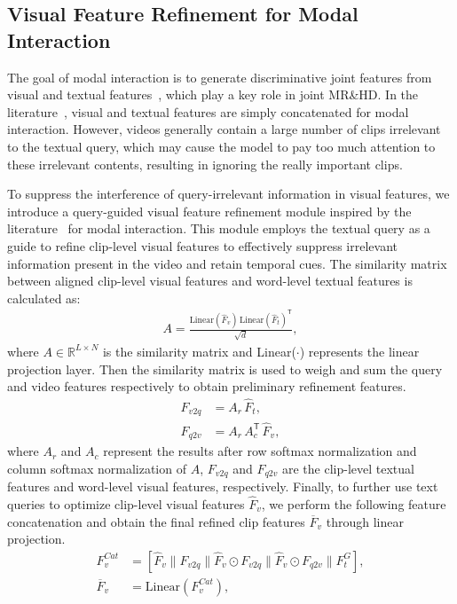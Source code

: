 \subsection{Visual Feature Refinement for Modal Interaction}
The goal of modal interaction is to generate discriminative joint features from visual and textual features~\cite{lei2021detecting}, which play a key role in joint MR\&HD.
In the literature~\cite{lei2021detecting}, visual and textual features are simply concatenated for modal interaction. However, videos generally contain a large number of clips irrelevant to the textual query, which may cause the model to pay too much attention to these irrelevant contents, resulting in ignoring the really important clips.

To suppress the interference of query-irrelevant information in visual features, we introduce a query-guided visual feature refinement module inspired by the literature~\cite{xiong2016dynamic} for modal interaction. This module employs the textual query as a guide to refine clip-level visual features to effectively suppress irrelevant information present in the video and retain temporal cues. The similarity matrix between aligned clip-level visual features and word-level textual features is calculated as:
\begin{align}
    A = \frac{\text{Linear}(\widehat{F}_{v}) \, \text{Linear}(\widehat{F}_{t})^{\mathsf{T}}}{\sqrt{d}},
\end{align}
where $A \in \mathbb{R}^{L \times N}$ is the similarity matrix and Linear($\cdot$) represents the linear projection layer. Then the similarity matrix is used to weigh and sum the query and video features respectively to obtain preliminary refinement features.
\begin{align}
    F_{v2q} &= A_r \, \widehat{F}_t, \\
    F_{q2v} &= A_{r} \, A_{c}^{\mathsf{T}} \, \widehat{F}_{v},
\end{align}
where $A_r$ and $A_c$ represent the results after row softmax normalization and column softmax normalization of $A$, $F_{v2q}$ and $F_{q2v}$ are the clip-level textual features and word-level visual features, respectively. Finally, to further use text queries to optimize clip-level visual features $\widehat{F}_v$, we perform the following feature concatenation and obtain the final refined clip features $\overline{F}_v$ through linear projection.
\begin{align}
    F^{Cat}_v &= \left[\widehat{F}_v\| F_{v2q}\| \widehat{F}_v \odot F_{v2q}\| \widehat{F}_v \odot F_{q2v}\| F_t^G \right], \\
    \overline{F}_v &= \text{Linear}(F^{Cat}_v),
\end{align}
